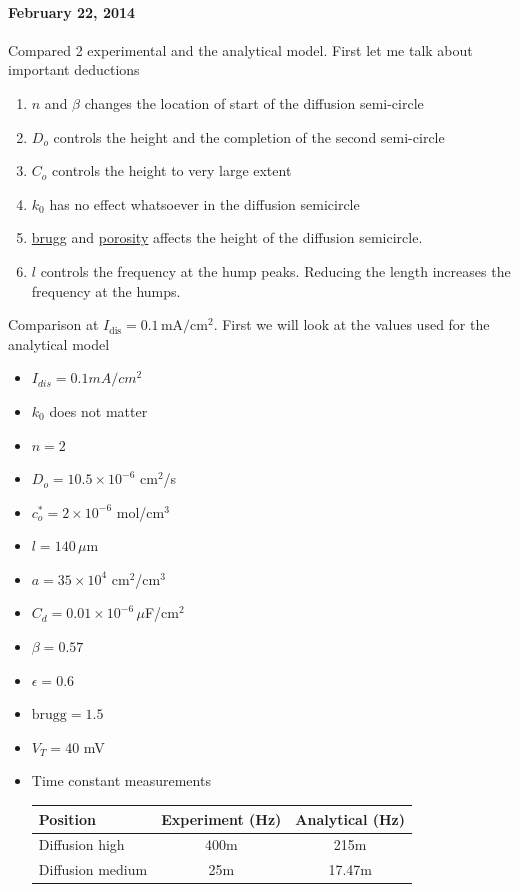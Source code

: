 \documentclass[12pt]{book}
\begin{document}
\paragraph*{February 22, 2014}
Compared 2 experimental and the analytical model.
First let me talk about important deductions
\begin{enumerate}
\item $n$ and $\beta$ changes the location of start of the diffusion semi-circle
\item $D_o$ controls the height and the completion of the second semi-circle
\item $C_o$ controls the height to very large extent
\item $k_0$ has no effect whatsoever in the diffusion semicircle
\item \underline{brugg} and \underline{porosity} affects the height of the diffusion semicircle.
\item $l$ controls the frequency at the hump peaks. Reducing the length increases the frequency at the humps. 
\end{enumerate} 
Comparison at $I_{\textrm{dis}}=0.1\,\textrm{mA}/\textrm{cm}^2$. First we will look at the values used for the analytical model
\begin{itemize}
\item $I_{dis}=0.1mA/cm^2$
\item $k_0$ does not matter
\item $n=2$
\item $D_o=10.5\times 10^{-6}$ cm$^2$/s
\item $c_o^*=2\times 10^{-6}$ mol/cm$^3$
\item $l=140\,\mu$m
\item $a=35\times 10^{4}$ cm$^2$/cm$^3$
\item $C_d=0.01\times 10^{-6}\,\mu$F/cm$^2$ 
\item $\beta=0.57$
\item $\epsilon=0.6$
\item $\textrm{brugg}=1.5$
\item $V_T=40$ mV
\item Time constant measurements

\begin{tabular}{ |l|| c| c| }
 \hline
 Position & Experiment (Hz) & Analytical (Hz)\\\hline
Diffusion high & 400m &	215m \\\cline{2-3}
Diffusion medium & 25m & 	17.47m  \\
  \hline
\end{tabular}
\end{itemize}
\end{document}
